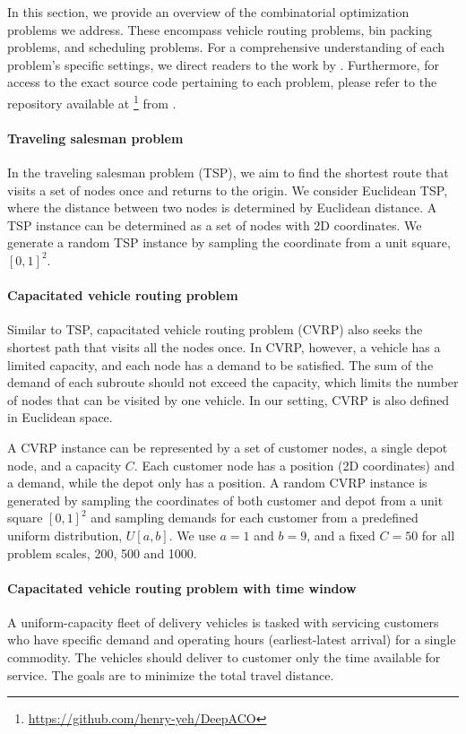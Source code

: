 \documentclass[twoside]{article}
\theoremstyle{plain}
\theoremstyle{definition}
\theoremstyle{remark}
\begin{document}
In this section, we provide an overview of the combinatorial optimization problems we address. These encompass vehicle routing problems, bin packing problems, and scheduling problems. For a comprehensive understanding of each problem's specific settings, we direct readers to the work by \citet{ye2023deepaco}. Furthermore, for access to the exact source code pertaining to each problem, please refer to the repository available at \footnote{\url{https://github.com/henry-yeh/DeepACO}} from \citet{ye2023deepaco}.

\paragraph{Traveling salesman problem} 
In the traveling salesman problem (TSP), we aim to find the shortest route that visits a set of nodes once and returns to the origin. We consider Euclidean TSP, where the distance between two nodes is determined by Euclidean distance. A TSP instance can be determined as a set of nodes with 2D coordinates. We generate a random TSP instance by sampling the coordinate from a unit square, $[0, 1]^2$.

\paragraph{Capacitated vehicle routing problem}
Similar to TSP, capacitated vehicle routing problem (CVRP) also seeks the shortest path that visits all the nodes once. In CVRP, however, a vehicle has a limited capacity, and each node has a demand to be satisfied. The sum of the demand of each subroute should not exceed the capacity, which limits the number of nodes that can be visited by one vehicle. In our setting, CVRP is also defined in Euclidean space.

A CVRP instance can be represented by a set of customer nodes, a single depot node, and a capacity $C$. Each customer node has a position (2D coordinates) and a demand, while the depot only has a position. A random CVRP instance is generated by sampling the coordinates of both customer and depot from a unit square $[0, 1]^2$ and sampling demands for each customer from a predefined uniform distribution, $U[a, b]$. We use $a=1$ and $b=9$, and a fixed $C=50$ for all problem scales, 200, 500 and 1000.

\paragraph{Capacitated vehicle routing problem with time window} A uniform-capacity fleet of delivery vehicles is tasked with servicing customers who have specific demand and operating hours (earliest-latest arrival) for a single commodity. The vehicles should deliver to customer only the time available for service. The goals are to minimize the total travel distance.
\end{document}
